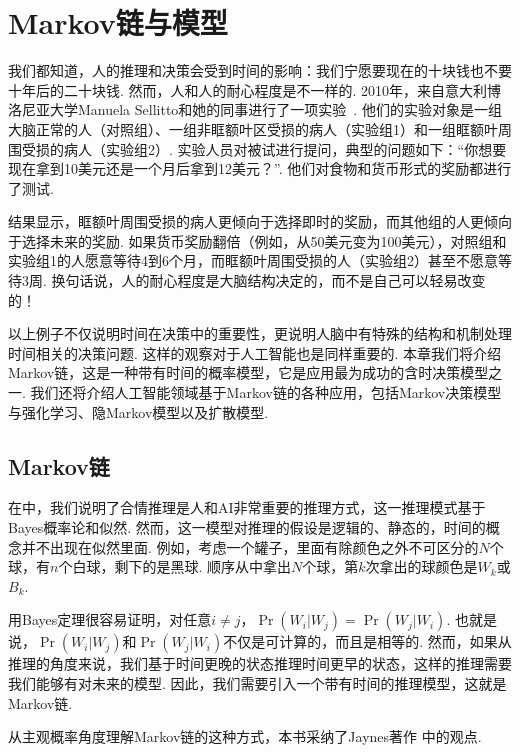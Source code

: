 \chapter{Markov链与模型}\label{chap:markov-chain}

我们都知道，人的推理和决策会受到时间的影响：我们宁愿要现在的十块钱也不要十年后的二十块钱. 然而，人和人的耐心程度是不一样的. 2010年，来自意大利博洛尼亚大学Manuela Sellitto和她的同事进行了一项实验~\cite{sellittoMyopicDiscountingFuture2010}. 他们的实验对象是一组大脑正常的人（对照组）、一组非眶额叶区受损的病人（实验组1）和一组眶额叶周围受损的病人（实验组2）. 实验人员对被试进行提问，典型的问题如下：“你想要现在拿到10美元还是一个月后拿到12美元？”. 他们对食物和货币形式的奖励都进行了测试. 

结果显示，眶额叶周围受损的病人更倾向于选择即时的奖励，而其他组的人更倾向于选择未来的奖励. 如果货币奖励翻倍（例如，从50美元变为100美元），对照组和实验组1的人愿意等待4到6个月，而眶额叶周围受损的人（实验组2）甚至不愿意等待3周. 换句话说，人的耐心程度是大脑结构决定的，而不是自己可以轻易改变的！

以上例子不仅说明时间在决策中的重要性，更说明人脑中有特殊的结构和机制处理时间相关的决策问题. 这样的观察对于人工智能也是同样重要的. 本章我们将介绍Markov链，这是一种带有时间的概率模型，它是应用最为成功的含时决策模型之一. 我们还将介绍人工智能领域基于Markov链的各种应用，包括Markov决策模型与强化学习、隐Markov模型以及扩散模型. 

\section{Markov链}

在中，我们说明了合情推理是人和AI非常重要的推理方式，这一推理模式基于Bayes概率论和似然. 然而，这一模型对推理的假设是逻辑的、静态的，时间的概念并不出现在似然里面. 例如，考虑一个罐子，里面有除颜色之外不可区分的$N$个球，有$n$个白球，剩下的是黑球. 顺序从中拿出$N$个球，第$k$次拿出的球颜色是$W_k$或$B_k$.

用Bayes定理很容易证明，对任意$i\neq j$，$\Pr(W_i|W_j)=\Pr(W_j|W_i)$. 也就是说，$\Pr(W_i|W_j)$和$\Pr(W_j|W_i)$不仅是可计算的，而且是相等的. 然而，如果从推理的角度来说，我们基于时间更晚的状态推理时间更早的状态，这样的推理需要我们能够有对未来的模型. 因此，我们需要引入一个带有时间的推理模型，这就是Markov链.

\begin{remark}
    从主观概率角度理解Markov链的这种方式，本书采纳了Jaynes著作\cite{jaynesProbabilityTheoryLogic2002} 中的观点. 
\end{remark}

